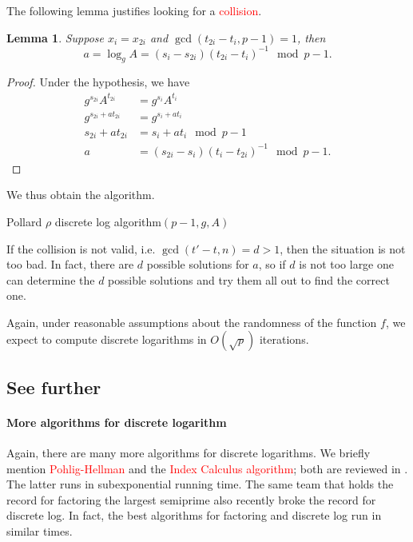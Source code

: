\documentclass[a4paper, 11pt, openany]{book}
\numberwithin{equation}{section}
\theoremstyle{plain}
\newtheorem{lemma}		[equation]	{Lemma}
\theoremstyle{definition}
\newcommand{\Z}{\mathbb{Z}}
\newcommand{\Important}[1]{\textcolor{red}{#1}}
\begin{document}
The following lemma justifies looking for a \Important{collision}.

\begin{lemma}
Suppose $x_i = x_{2i}$ and $\gcd(t_{2i} - t_i, p-1) = 1$, then
\[
    a = \log_g A = (s_i - s_{2i})(t_{2i}- t_i)^{-1} \mod p-1.
\]
\end{lemma}

\begin{proof}
Under the hypothesis, we have
\begin{align*}
    g^{s_{2i}} A^{t_{2i}} &= g^{s_i} A^{t_i}\\
    g^{s_{2i} + at_{2i} } &= g^{ s_i + at_i }\\
    s_{2i} + at_{2i}  &=  s_i + at_i \mod p-1\\
    a &= (s_{2i} - s_i)(t_i - t_{2i})^{-1} \mod p-1.
\end{align*}
\end{proof}

We thus obtain the algorithm.

\begin{algorithm}[H]
\caption{Pollard $\rho$ discrete log algorithm$(p-1,g,A)$}
\begin{algorithmic}[1]
	\State{Partition $\Z_p^* = S_1 \cup S_2 \cup S_3$}
    \EndWhile
    \Else{}
    \EndIf
\end{algorithmic}
\end{algorithm}

If the collision is not valid, i.e. $\gcd(t' - t, n) = d > 1$, then the situation is not too bad. In fact, there are $d$ possible solutions for $a$, so if $d$ is not too large one can determine the $d$ possible solutions and try them all out to find the correct one.

Again, under reasonable assumptions about the randomness of the function $f$, we expect to compute discrete logarithms in $O(\sqrt{p})$ iterations.

\subsection{See further}

\paragraph{More algorithms for discrete logarithm}
Again, there are many more algorithms for discrete logarithms. We briefly mention \Important{Pohlig-Hellman} and the \Important{Index Calculus algorithm}; both are reviewed in \cite{Sti02}. The latter runs in subexponential running time. The same team that holds the record for factoring the largest semiprime also recently broke the record for discrete log. In fact, the best algorithms for factoring and discrete log run in similar times.
\end{document}
